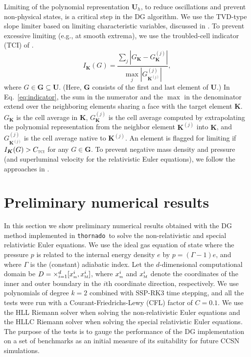\documentclass[letterpaper]{jpconf}
\newcommand{\vect}[1]{\boldsymbol{#1}}
\newcommand{\f}[2]{\frac{#1}{#2}}
\newcommand{\bK}{\vect{K}}
\newcommand{\xMin}{x_{\textnormal{\tiny m}}}
\newcommand{\xMax}{x_{\textnormal{\tiny M}}}
\newcommand{\TCI}{\textnormal{\tiny\textsc{TCI}}}
\newcommand{\thornado}{\texttt{thornado}}
\begin{document}
Limiting of the polynomial representation $\vect{U}_{h}$, to reduce oscillations and prevent non-physical states, is a critical step in the DG algorithm.  
We use the TVD-type slope limiter based on limiting characteristic variables, discussed in \cite{cockburnShu_1998}.  
To prevent excessive limiting (e.g., at smooth extrema), we use the troubled-cell indicator (TCI) of \cite{fuShu_2017}.  
\begin{equation}
  I_{\bK}(G) = \f{\sum_{j}|G_{\bK}-G_{\bK}^{(j)}|}{\max_{j}|G_{\bK^{(j)}}^{(j)}|},
  \label{eq:indicator}
\end{equation}
where $G\in\vect{G}\subseteq\vect{U}$.  
(Here, $\vect{G}$ consists of the first and last element of $\vect{U}$.)  
In Eq.~\eqref{eq:indicator}, the sum in the numerator and the $\max$ in the denominator extend over the neighboring elements sharing a face with the target element $\bK$.  
$G_{\bK}$ is the cell average in $\bK$, $G_{\bK}^{(j)}$ is the cell average computed by extrapolating the polynomial representation from the neighbor element $\bK^{(j)}$ into $\bK$, and $G_{\bK^{(j)}}^{(j)}$ is the cell average native to $\bK^{(j)}$.  
An element is flagged for limiting if $I_{\bK}(G)>C_{\TCI}$ for any $G\in\vect{G}$.  
To prevent negative mass density and pressure (and superluminal velocity for the relativistic Euler equations), we follow the approaches in \cite{zhangShu_2010,wuTang_2015,qin_etal_2016}.  

\section{Preliminary numerical results}
\label{sec:numerical}

In this section we show preliminary numerical results obtained with the DG method implemented in \thornado\ to solve the non-relativistic and special relativistic Euler equations.  
We use the ideal gas equation of state where the pressure $p$ is related to the internal energy density $e$ by $p=(\Gamma-1)e$, and where $\Gamma$ is the (constant) adiabatic index.  
Let the $d$-dimensional computational domain be $D=\times_{i=1}^{d}[\xMin^{i},\xMax^{i}]$, where $\xMin^{i}$ and $\xMax^{i}$ denote the coordinates of the inner and outer boundary in the $i$th coordinate direction, respectively.  
We use polynomials of degree $k=2$ combined with SSP-RK3 time stepping, and all the tests were run with a Courant-Friedrichs-Lewy (CFL) factor of $C=0.1$.  
We use the HLL Riemann solver when solving the non-relativistic Euler equations and the HLLC Riemann solver when solving the special relativistic Euler equations.  
The purpose of the tests is to gauge the performance of the DG implementation on a set of benchmarks as an initial measure of its suitability for future CCSN simulations.  
\end{document}
